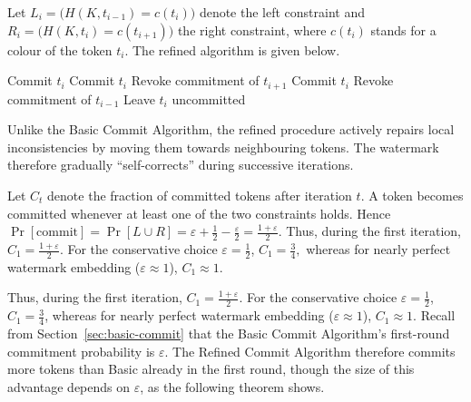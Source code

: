 \documentclass[a4paper,11pt]{llncs}
\begin{document}
Let
$
L_i=
\bigl(
H(K,t_{i-1})=c(t_i)
\bigr)
$
denote the left constraint and
$
R_i=
\bigl(
H(K,t_i)=c(t_{i+1})
\bigr)
$
the right constraint, where $c(t_i)$ stands for a colour of the token $t_i$.
The refined algorithm is given below.
%
\begin{algorithm}[H]
\caption{Refined Commit Algorithm}
\label{alg:refined}
\begin{algorithmic}[1]
        \State Commit $t_i$
        \State Commit $t_i$
        \State Revoke commitment of $t_{i+1}$
        \State Commit $t_i$
        \State Revoke commitment of $t_{i-1}$
    \Else
        \State Leave $t_i$ uncommitted
    \EndIf
\EndFor
\end{algorithmic}
\end{algorithm}
%
Unlike the Basic Commit Algorithm, the refined procedure actively repairs
local inconsistencies by moving them towards neighbouring tokens. The
watermark therefore gradually ``self-corrects'' during successive
iterations.

Let
$
C_t
$
denote the fraction of committed tokens after iteration $t$.
A token becomes committed whenever at least one of the two constraints
holds. Hence
$
\Pr[\text{commit}]
=
\Pr[L\cup R]
=
\varepsilon+\frac12-\frac{\varepsilon}{2}
=
\frac{1+\varepsilon}{2}.
$
Thus, during the first iteration,
$
C_1=\frac{1+\varepsilon}{2}.
$
For the conservative choice $\varepsilon=\frac12$,
$
C_1=\frac34,
$
whereas for nearly perfect watermark embedding
($\varepsilon\approx1$),
$
C_1\approx1.
$


Thus, during the first iteration, $C_1=\frac{1+\varepsilon}{2}$. For the conservative choice
$\varepsilon=\frac12$, $C_1=\frac34$, whereas for nearly perfect watermark embedding
($\varepsilon\approx1$), $C_1\approx1$. Recall from Section~\ref{sec:basic-commit} that the
Basic Commit Algorithm's first-round commitment probability is $\varepsilon$. The Refined
Commit Algorithm therefore commits more tokens than Basic already in the first round,
though the size of this advantage depends on $\varepsilon$, as the following theorem shows.
\end{document}
